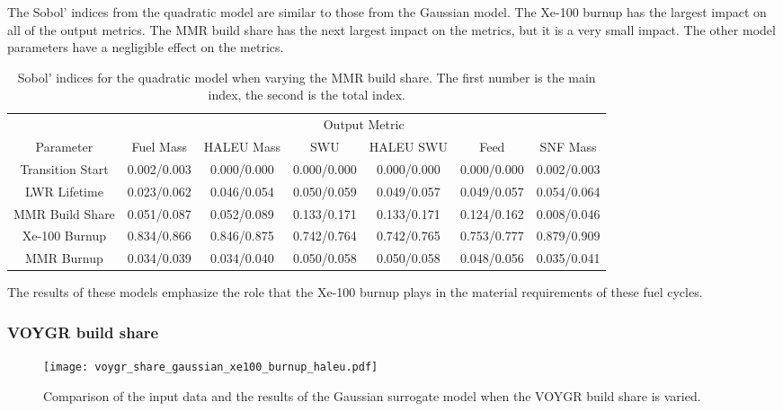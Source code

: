 The Sobol' indices from the quadratic model are similar to those from the 
Gaussian model. The Xe-100 burnup has the largest impact on all of the 
output metrics. The \gls{MMR} build share has the next largest impact 
on the metrics, but it is a very small impact. The other model 
parameters have a negligible effect on the metrics. 

\begin{table}
    \centering
    \caption{Sobol' indices for the quadratic model when varying the MMR 
    build share. The first number is the main index, the second is the total 
    index.}
    \label{tab:s7_sobol_mmr_quadratic}
    \begin{tabular}{c c c c c c c}
        \hline
        & \multicolumn{6}{c}{Output Metric} \\
        Parameter & Fuel Mass & HALEU Mass & SWU & HALEU SWU & Feed & SNF Mass \\
        \hline
        Transition Start & 0.002/0.003 & 0.000/0.000 & 0.000/0.000 &
                        0.000/0.000 & 0.000/0.000 & 0.002/0.003\\
        LWR Lifetime & 0.023/0.062 & 0.046/0.054 & 0.050/0.059 &
                       0.049/0.057 & 0.049/0.057 & 0.054/0.064\\
        MMR Build Share & 0.051/0.087 & 0.052/0.089 & 0.133/0.171 &
                          0.133/0.171 & 0.124/0.162 & 0.008/0.046\\
        Xe-100 Burnup & \cellcolor{green!25}0.834/0.866 & \cellcolor{green!25}0.846/0.875 & \cellcolor{green!25}0.742/0.764 &
        \cellcolor{green!25}0.742/0.765 & \cellcolor{green!25}0.753/0.777 & \cellcolor{green!25}0.879/0.909\\
        MMR Burnup & 0.034/0.039 & 0.034/0.040 & 0.050/0.058 & 
                     0.050/0.058 & 0.048/0.056 & 0.035/0.041\\
        \hline        
    \end{tabular}
\end{table}

The results of these models emphasize the role that the Xe-100 burnup 
plays in the material requirements of these fuel cycles. 

\subsubsection{VOYGR build share}

\begin{figure}
    \centering 
    \texttt{[image: voygr\_share\_gaussian\_xe100\_burnup\_haleu.pdf]}
    \caption{Comparison of the input data and the results of the Gaussian 
    surrogate model when the VOYGR build share is varied.}
    \label{fig:s7_voygr_gaussian}
\end{figure}


